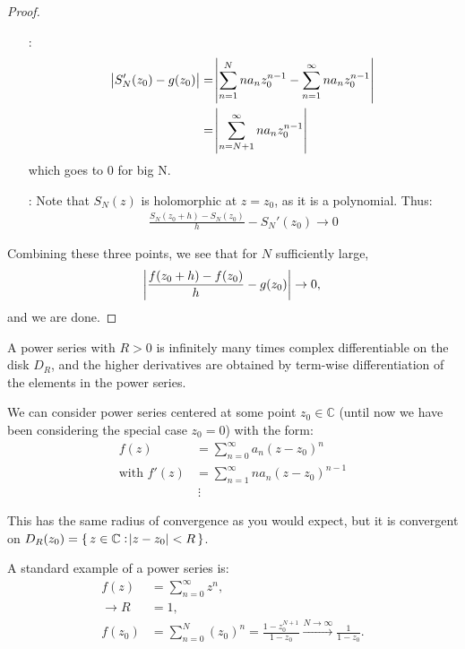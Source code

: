 \begin{proof}
\begin{itemize}
    \item[\circled{2} :]
    \begin{align*}
        \abs{S_N'(z_0)-g(z_0)} &=\abs{\sum_{n=1}^N na_n z_0^{n-1} -\sum_{n=1}^\infty na_n z_0^{n-1}}\\
        &= \abs{\sum_{n=N+1}^\infty na_n z_0^{n-1}}
    \end{align*}
    which goes to 0 for big N.
    
    \item[\circled{1} :] Note that $S_N(z)$ is holomorphic at $z=z_0$, as it is a polynomial. Thus:
    \begin{align*}
        \frac{S_N(z_0+h)-S_N(z_0)}{h} - S_N'(z_0) \rightarrow 0
    \end{align*}
    
\end{itemize}

Combining these three points, we see that for $N$ sufficiently large,
\begin{align*}
    \abs{\frac{f(z_0+h)-f(z_0)}{h} - g(z_0)} \rightarrow 0,
\end{align*}
and we are done.
\end{proof}



\begin{corollary}
A power series with $R>0$ is infinitely many times complex differentiable on the disk $D_R$, and the higher derivatives are obtained by term-wise differentiation of the elements in the power series.
\end{corollary}

\begin{remark}
We can consider power series centered at some point $z_0\in\mathbb{C}$ (until now we have been considering the special case $z_0 = 0$) with the form:
\begin{align*}
    f(z)&=\sum_{n=0}^\infty a_n(z-z_0)^n\\
    \text{with } f'(z)&=\sum_{n=1}^\infty na_n(z-z_0)^{n-1}\\
    & \ \vdots
\end{align*}

This has the same radius of convergence as you would expect, but it is convergent on $D_R(z_0)=\set{z\in \mathbb{C} : \abs{z-z_0}<R }$.
\end{remark}

\begin{example} A standard example of a power series is:
\begin{align*}
    f(z)&=\sum_{n=0}^\infty z^n ,\\
    \rightarrow R&= 1, \\
    f(z_0)&=\sum_{n=0}^N (z_0)^n = \frac{1-z_0^{N+1}}{1-z_0} \xrightarrow{N\rightarrow\infty} \frac{1}{1-z_0}.
    \end{align*}
\end{example}

